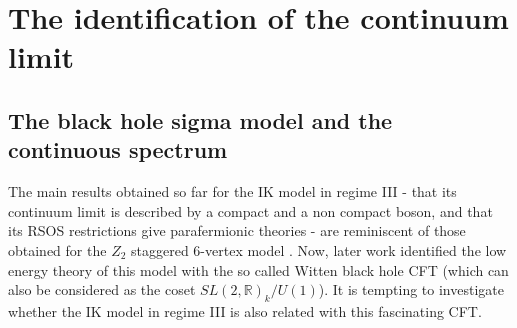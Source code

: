 \documentclass[11pt]{article}
\begin{document}
\section{The identification of the continuum limit}\label{Sec:BlackHoleIdent}

\subsection{The black hole sigma model and the continuous spectrum}

The main results obtained so far for the IK model in regime III  - that its continuum limit is described by a compact and a non compact boson, and that its RSOS restrictions give  parafermionic theories - are reminiscent 
of those obtained for  the  $Z_2$ staggered 6-vertex model  \cite{IkhlefJS1}. Now, later work \cite{IkhlefJS3} identified the low energy theory of this model with the so called Witten black hole CFT \cite{BlackHoleCFT} (which can also be considered as the coset $SL(2,\mathbb{R})_k/U(1)$).  It is tempting to investigate whether the IK model in regime III is also related with this fascinating CFT. 
\end{document}
